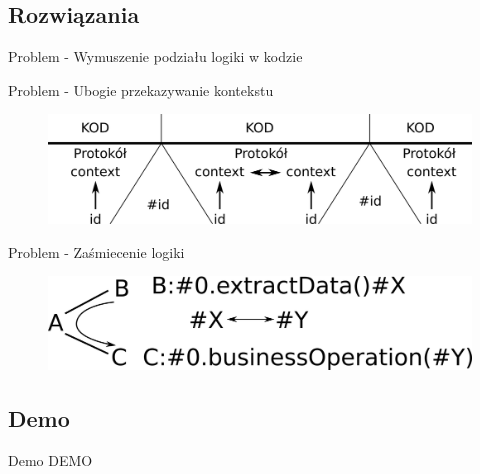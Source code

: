 \documentclass[smaller]{beamer}
\begin{document}

\subsection{Rozwiązania}
\begin{frame}{Problem - Wymuszenie podziału logiki w kodzie}

\LstLogicDropSolution

\end{frame}


\begin{frame}{Problem - Ubogie przekazywanie kontekstu}
\begin{figure}
 \centering
 \includegraphics[width=1\textwidth]{contextMapSolutionFig}
\end{figure}
\end{frame}

\begin{frame}{Problem - Zaśmiecenie logiki}
\LstLogicGarbage

\begin{figure}
 \centering
 \includegraphics[width=1\textwidth]{logicGarbageSimpleSolutionFig}
\end{figure}
\end{frame}

\subsection{Demo}
\begin{frame}{Demo}
 DEMO
\end{frame}
\end{document}
